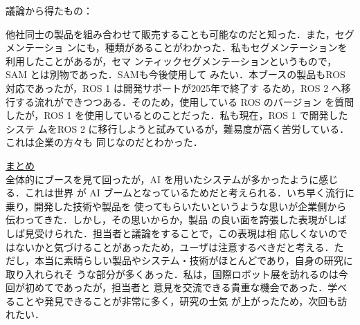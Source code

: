 \documentclass{jsarticle}
\begin{document}
\hspace*{4.7zw}議論から得たもの：

\hspace*{5.7zw}他社同士の製品を組み合わせて販売することも可能なのだと知った．また，セグメンテーショ
\hspace*{6.7zw}ンにも，種類があることがわかった．私もセグメンテーションを利用したことがあるが，セマ
\hspace*{6.7zw}ンティックセグメンテーションというもので，SAM とは別物であった．SAMも今後使用して
\hspace*{6.7zw}みたい．本ブースの製品もROS 対応であったが，ROS 1 は開発サポートが2025年で終了す
\hspace*{6.7zw}るため，ROS 2 へ移行する流れができつつある．そのため，使用している ROS のバージョン
\hspace*{6.7zw}を質問したが，ROS 1 を使用しているとのことだった．私も現在，ROS 1 で開発したシステ
\hspace*{6.7zw}ムをROS 2 に移行しようと試みているが，難易度が高く苦労している．これは企業の方々も
\hspace*{6.7zw}同じなのだとわかった．\\

\vspace*{10zh}

\hspace*{4.7zw}\underline{まとめ}\\

\hspace*{5.7zw}全体的にブースを見て回ったが，AI を用いたシステムが多かったように感じる．これは世界
\hspace*{5.7zw}が AI ブームとなっているためだと考えられる．いち早く流行に乗り，開発した技術や製品を
\hspace*{5.7zw}使ってもらいたいというような思いが企業側から伝わってきた．しかし，その思いからか，製品
\hspace*{5.7zw}の良い面を誇張した表現がしばしば見受けられた．担当者と議論をすることで，この表現は相
\hspace*{5.7zw}応しくないのではないかと気づけることがあったため，ユーザは注意するべきだと考える．た
\hspace*{5.7zw}だし，本当に素晴らしい製品やシステム・技術がほとんどであり，自身の研究に取り入れられそ
\hspace*{5.7zw}うな部分が多くあった．私は，国際ロボット展を訪れるのは今回が初めてであったが，担当者と
\hspace*{5.7zw}意見を交流できる貴重な機会であった．学べることや発見できることが非常に多く，研究の士気
\hspace*{5.7zw}が上がったため，次回も訪れたい．
\end{document}
